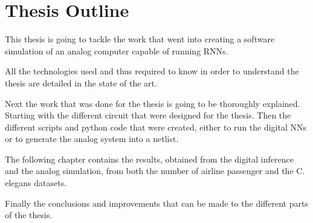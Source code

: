 \section{Thesis Outline}
\label{sec:outline}

This thesis is going to tackle the work that went into creating a software simulation of an analog computer capable of running \aclp{RNN}.

All the technologies used and thus required to know in order to understand the thesis are detailed in the state of the art.

Next the work that was done for the thesis is going to be thoroughly explained. Starting with the different circuit that were designed for the thesis. Then the different scripts and python code that were created, either to run the digital \acp{NN} or to generate the analog system into a netlist.

The following chapter contains the results, obtained from the digital inference and the analog simulation, from both the number of airline passenger and the \ac{C. elegans} datasets.

Finally the conclusions and improvements that can be made to the different parts of the thesis.

